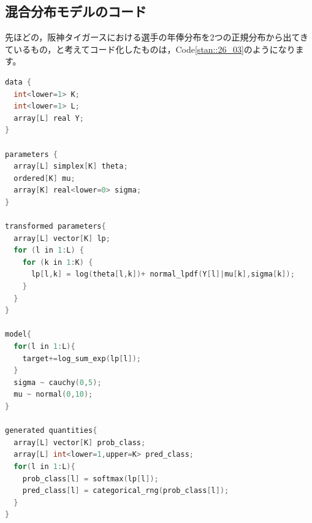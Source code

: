 \documentclass{ltjsbook}
\begin{document}
\subsection{混合分布モデルのコード}
先ほどの，阪神タイガースにおける選手の年俸分布を2つの正規分布から出てきているもの，と考えてコード化したものは，Code\ref{stan::26_03}のようになります。
\begin{lstlisting}[language=C++,label={stan::26_03},caption={混合正規モデル}]
data {
  int<lower=1> K;
  int<lower=1> L;
  array[L] real Y;
}

parameters {
  array[L] simplex[K] theta;
  ordered[K] mu;
  array[K] real<lower=0> sigma;
}

transformed parameters{
  array[L] vector[K] lp;
  for (l in 1:L) {
    for (k in 1:K) {
      lp[l,k] = log(theta[l,k])+ normal_lpdf(Y[l]|mu[k],sigma[k]);
    }
  }
}

model{
  for(l in 1:L){
    target+=log_sum_exp(lp[l]);
  }
  sigma ~ cauchy(0,5);
  mu ~ normal(0,10);
}

generated quantities{
  array[L] vector[K] prob_class;
  array[L] int<lower=1,upper=K> pred_class;
  for(l in 1:L){
    prob_class[l] = softmax(lp[l]);
    pred_class[l] = categorical_rng(prob_class[l]);
  }
}
\end{lstlisting}
\end{document}
